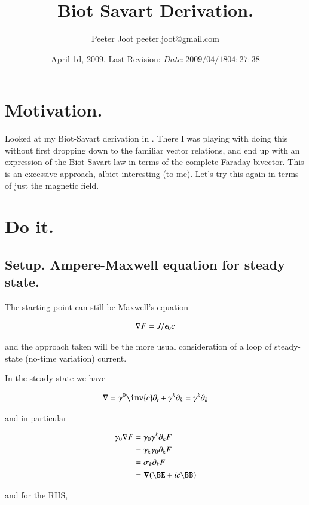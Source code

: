 \documentclass{article}
\title{ Biot Savart Derivation. }
\author{Peeter Joot \quad peeter.joot@gmail.com }
\date{ April 1d, 2009.  Last Revision: $Date: 2009/04/18 04:27:38 $ }
\begin{document}
\maketitle{}
\tableofcontents
\section{ Motivation. }

Looked at my Biot-Savart derivation in \cite{PJelectricFieldEnergy}.  There I was playing with doing this without first dropping down to the
familiar vector relations, and end up with an expression of the Biot Savart law in terms of the complete Faraday bivector.  This is
an excessive approach, albiet interesting (to me).  Let's try this again in terms of just the magnetic field.

\section{ Do it. }

\subsection{ Setup. Ampere-Maxwell equation for steady state. }

The starting point can still be Maxwell's equation

\begin{align}
\nabla F = J/\epsilon_0 c
\end{align}

and the approach taken will be the more usual consideration of a loop of steady-state (no-time variation) current.

In the steady state we have

\begin{align*}
\grad = \gamma^0 \inv{c} \partial_t + \gamma^k \partial_k = \gamma^k \partial_k
\end{align*}

and in particular

\begin{align*}
\gamma_0 \grad F
&= \gamma_0 \gamma^k \partial_k F \\
&= \gamma_k \gamma_0 \partial_k F \\
&= \sigma_k \partial_k F \\
&= \spacegrad (\BE + i c \BB) \\
\end{align*}

and for the RHS,
\end{document}
